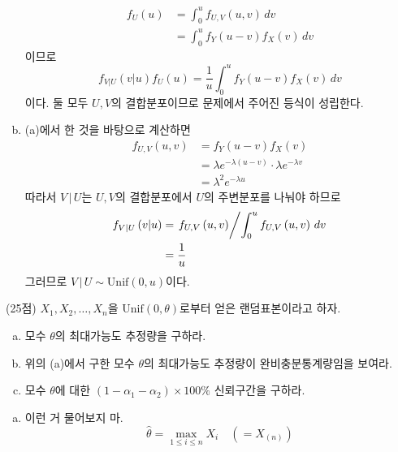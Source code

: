 \documentclass[answers]{exam}
\begin{document}
\begin{questions}
\begin{solution}
\begin{enumerate}[(a)]
\begin{align}
        f_{U}\left(u\right) &= \int_{0}^{u}f_{U,V}\left(u,v\right)\,dv\\
        &= \int_{0}^{u}f_{Y}\left(u-v\right)f_{X}\left(v\right)\,dv
        \end{align}
        이므로
        \begin{equation}
          f_{V|U}\left(v|u\right)f_{U}\left(u\right)= \dfrac{1}{u}\int_{0}^{u}f_{Y}\left(u-v\right)f_{X}\left(v\right)\,dv
        \end{equation}
        이다. 둘 모두 $U,V$의 결합분포이므로 문제에서 주어진 등식이 성립한다.
        \item (a)에서 한 것을 바탕으로 계산하면
        \begin{align}
          f_{U,V}\left(u,v\right) &= f_{Y}\left(u-v\right)f_{X}\left(v\right)\\
          &= \lambda e^{-\lambda\left(u-v\right)}\cdot \lambda e^{-\lambda v}\\
          &=\lambda^{2}e^{-\lambda u}
        \end{align}
        따라서 $V\,|\,U$는 $U,V$의 결합분포에서 $U$의 주변분포를 나눠야 하므로
        \begin{align}
          f_{V|U}\left(v|u\right) &= \left.f_{U,V}\left(u,v\right)\middle/\int_{0}^{u}f_{U,V}\left(u,v\right) \,dv\right.\\
          &=\dfrac{1}{u}
        \end{align}
        그러므로 $V\,|\,U\sim \mathrm{Unif}\left(0,u\right)$이다.
      \end{enumerate}
    \end{solution}
    \question
    (25점) $X_{1},X_{2},\ldots,X_{n}$을 $\mathrm{Unif}\left(0,\theta\right)$로부터 얻은 랜덤표본이라고 하자.
    \begin{enumerate}[(a)]
      \item 모수 $\theta$의 최대가능도 추정량을 구하라.
      \item 위의 (a)에서 구한 모수 $\theta$의 최대가능도 추정량이 완비충분통계량임을 보여라.
      \item 모수 $\theta$에 대한 $\left(1-\alpha_{1}-\alpha_{2}\right)\times 100\%$ 신뢰구간을 구하라.
    \end{enumerate}
    \begin{solution}
      \begin{enumerate}[(a)]
        \item 이런 거 물어보지 마.
        \begin{equation}
          \widehat{\theta}=\max_{1\leq i \leq n}X_{i} \quad \left(=X_{\left(n\right)}\right)

\end{equation}
\end{enumerate}
\end{solution}
\end{questions}
\end{document}
